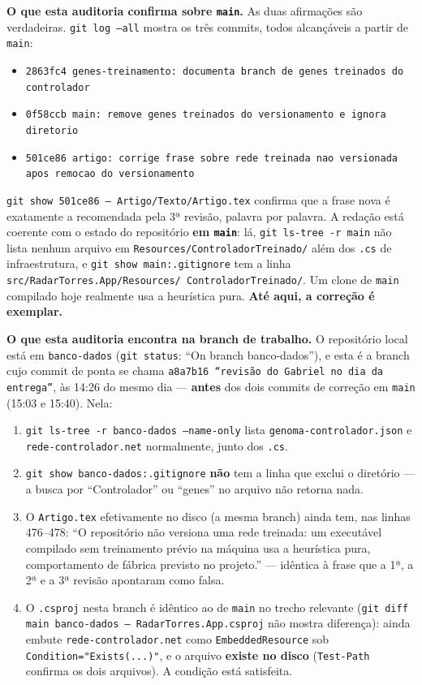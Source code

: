 \documentclass[11pt,a4paper]{article}
\begin{document}
\textbf{O que esta auditoria confirma sobre \texttt{main}.} As duas afirmações são verdadeiras.
\texttt{git log --all} mostra os três commits, todos alcançáveis a partir de \texttt{main}:

\begin{itemize}
  \item \texttt{2863fc4 genes-treinamento: documenta branch de genes treinados do controlador}
  \item \texttt{0f58ccb main: remove genes treinados do versionamento e ignora diretorio}
  \item \texttt{501ce86 artigo: corrige frase sobre rede treinada nao versionada apos remocao do
  versionamento}
\end{itemize}

\texttt{git show 501ce86 -- Artigo/Texto/Artigo.tex} confirma que a frase nova é exatamente a
recomendada pela 3ª revisão, palavra por palavra. A redação está coerente com o estado do repositório
\textbf{em \texttt{main}}: lá, \texttt{git ls-tree -r main} não lista nenhum arquivo em
\texttt{Resources/ControladorTreinado/} além dos \texttt{.cs} de infraestrutura, e
\texttt{git show main:.gitignore} tem a linha \texttt{src/RadarTorres.App/Resources/\allowbreak
ControladorTreinado/}. Um clone de \texttt{main} compilado hoje realmente usa a heurística pura.
\textbf{Até aqui, a correção é exemplar.}

\textbf{O que esta auditoria encontra na branch de trabalho.} O repositório local está em
\texttt{banco-dados} (\texttt{git status}: ``On branch banco-dados''), e esta é a branch cujo commit
de ponta se chama \texttt{a8a7b16 ``revisão do Gabriel no dia da entrega''}, às 14:26 do mesmo dia ---
\textbf{antes} dos dois commits de correção em \texttt{main} (15:03 e 15:40). Nela:

\begin{enumerate}
  \item \texttt{git ls-tree -r banco-dados --name-only} lista \texttt{genoma-controlador.json} e
  \texttt{rede-controlador.net} normalmente, junto dos \texttt{.cs}.
  \item \texttt{git show banco-dados:.gitignore} \textbf{não} tem a linha que exclui o diretório --- a
  busca por ``Controlador'' ou ``genes'' no arquivo não retorna nada.
  \item O \texttt{Artigo.tex} efetivamente no disco (a mesma branch) ainda tem, nas linhas 476--478:
  ``O repositório não versiona uma rede treinada: um executável compilado sem treinamento prévio na
  máquina usa a heurística pura, comportamento de fábrica previsto no projeto.'' --- idêntica à frase
  que a 1ª, a 2ª e a 3ª revisão apontaram como falsa.
  \item O \texttt{.csproj} nesta branch é idêntico ao de \texttt{main} no trecho relevante
  (\texttt{git diff main banco-dados -- RadarTorres.App.csproj} não mostra diferença): ainda embute
  \texttt{rede-controlador.net} como \texttt{EmbeddedResource} sob
  \texttt{Condition="Exists(...)"}, e o arquivo \textbf{existe no disco} (\texttt{Test-Path} confirma
  os dois arquivos). A condição está satisfeita.
\end{enumerate}
\end{document}
